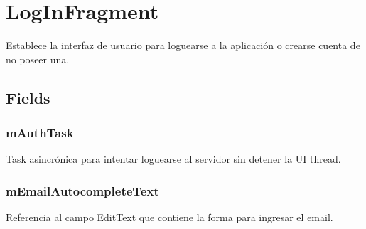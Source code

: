 \documentclass[letterpaper,10pt,english]{sphinxmanual}
\begin{document}
\section{LogInFragment}
\label{Fragments/LogInFragment:loginfragment}\label{Fragments/LogInFragment::doc}

\begin{fulllineitems}
\label{Fragments/LogInFragment:com.fiuba.tallerii.jobify.LogInFragment}
Establece la interfaz de usuario para loguearse a la aplicación o crearse cuenta de no poseer una.

\end{fulllineitems}



\subsection{Fields}
\label{Fragments/LogInFragment:fields}

\subsubsection{mAuthTask}
\label{Fragments/LogInFragment:mauthtask}

\begin{fulllineitems}
\label{Fragments/LogInFragment:com.fiuba.tallerii.jobify.LogInFragment.mAuthTask}
Task asincrónica para intentar loguearse al servidor sin detener la UI thread.

\end{fulllineitems}



\subsubsection{mEmailAutocompleteText}
\label{Fragments/LogInFragment:memailautocompletetext}

\begin{fulllineitems}
\label{Fragments/LogInFragment:com.fiuba.tallerii.jobify.LogInFragment.mEmailAutocompleteText}
Referencia al campo EditText que contiene la forma para ingresar el email.

\end{fulllineitems}
\end{document}
